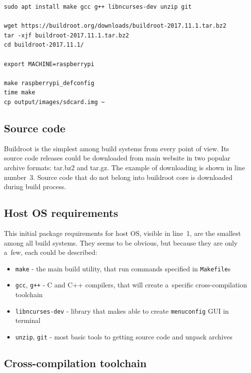 \documentclass[printmode]{mgr}
\begin{document}

\begin{lstlisting}
sudo apt install make gcc g++ libncurses-dev unzip git 

wget https://buildroot.org/downloads/buildroot-2017.11.1.tar.bz2
tar -xjf buildroot-2017.11.1.tar.bz2
cd buildroot-2017.11.1/

export MACHINE=raspberrypi

make raspberrypi_defconfig
time make
cp output/images/sdcard.img ~
\end{lstlisting}



\subsection*{Source code}

Buildroot is the simplest among build systems from every point of view.
Its source code releases could be downloaded from main website in two popular archive formats: tar.bz2 and tar.gz.
The example of downloading is shown in line number~3.
Source code that do not belong into buildroot core is downloaded during build process.

\subsection*{Host OS requirements}

This initial package requirements for host OS, visible in line~1, are the smallest among all build systems.
They seems to be obvious, but because they are only a~few, each could be described:

\begin{itemize}
    \item \verb|make| - the main build utility, that run commands specified in \verb|Makefile|s
    \item \verb|gcc|, \verb|g++| - C and C++ compilers, that will create a~specific cross-compilation toolchain
    \item \verb|libncurses-dev| - library that makes able to create \verb|menuconfig| GUI in terminal
    \item \verb|unzip|, \verb|git| - most basic tools to getting source code and unpack archives
\end{itemize}

\subsection*{Cross-compilation toolchain}
\end{document}
